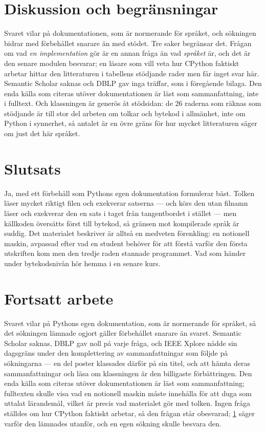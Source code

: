 \section{Diskussion och begränsningar}
\label{sec:py-diskussion}

Svaret vilar på dokumentationen, som är normerande för språket, och
sökningen bidrar med förbehållet snarare än med stödet.  Tre saker
begränsar det.  Frågan om vad \emph{en implementation} gör är en annan
fråga än vad \emph{språket} är, och det är den senare modulen besvarar;
en läsare som vill veta hur CPython faktiskt arbetar hittar den
litteraturen i tabellens stödjande rader men får inget svar här.
Semantic Scholar saknas och DBLP gav inga träffar, som i föregående
bilaga.  Den enda källa som citeras utöver dokumentationen är läst som
sammanfattning, inte i fulltext.  Och klassningen är generös åt
stödsidan: de 26 raderna som räknas som stödjande är till stor del
arbeten om tolkar och bytekod i allmänhet, inte om Python i synnerhet,
så antalet är en övre gräns för hur mycket litteraturen säger om just det
här språket.

\section{Slutsats}
\label{sec:py-slutsats}

Ja, med ett förbehåll som Pythons egen dokumentation formulerar bäst.
Tolken läser mycket riktigt filen och exekverar satserna --- och körs
den utan filnamn läser och exekverar den en sats i taget från
tangentbordet i stället --- men källkoden översätts först till bytekod,
så gränsen mot kompilerade språk är suddig.  Det materialet beskriver är
alltså en medveten förenkling: en notionell maskin, avpassad efter vad en
student behöver för att förstå varför den första utskriften kom men den
tredje raden stannade programmet.  Vad som händer under bytekodsnivån hör hemma
i en senare kurs.

\section{Fortsatt arbete}
\label{sec:py-fortsatt}

Svaret vilar på Pythons egen dokumentation, som är normerande för
språket, så det sökningen lämnade ogjort gäller förbehållet snarare än
svaret.  Semantic Scholar saknas, DBLP gav noll på varje fråga, och IEEE
Xplore nådde sin dagsgräns under den komplettering av sammanfattningar
som följde på sökningarna --- en del poster klassades därför på sin
titel, och att hämta deras sammanfattningar och läsa om klassningen är
den billigaste förbättringen.  Den enda källa som citeras utöver
dokumentationen\autocite{Sorva2013NotionalMachines} är läst som
sammanfattning; fulltexten skulle visa vad en notionell maskin måste
innehålla för att duga som uttalat lärandemål, vilket är precis vad
materialet gör med tolken.  Ingen fråga ställdes om hur CPython faktiskt
arbetar, så den frågan står obesvarad; \cref{sec:py-diskussion} säger
varför den lämnades utanför, och en egen sökning skulle besvara den.

